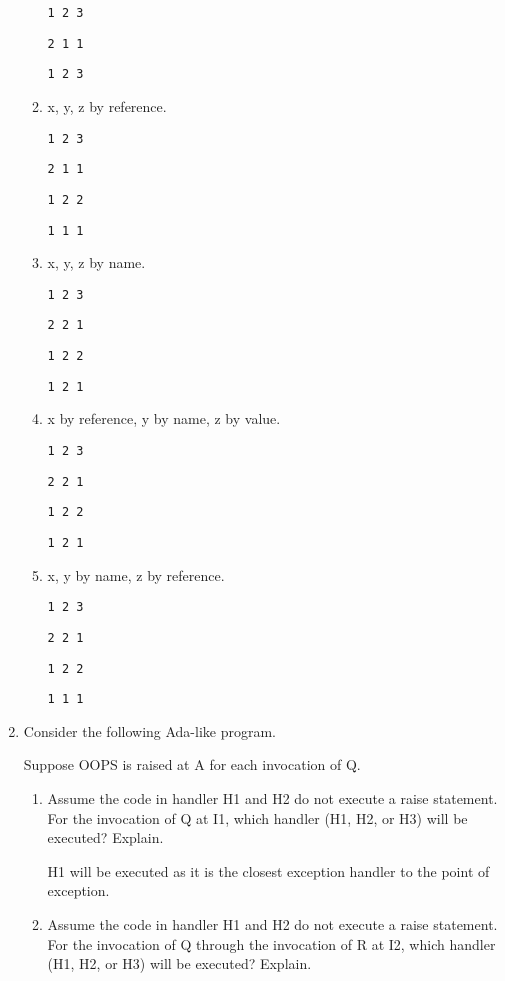 \documentclass[12pt,letterpaper]{article}
\begin{document}
\begin{enumerate}
\begin{enumerate}
          \texttt{1 2 3}

          \texttt{2 1 1}

          \texttt{1 2 3}

        \item x, y, z by reference.

          \texttt{1 2 3}

          \texttt{2 1 1}

          \texttt{1 2 2}

          \texttt{1 1 1}

        \item x, y, z by name.

          \texttt{1 2 3}

          \texttt{2 2 1}

          \texttt{1 2 2}

          \texttt{1 2 1}

        \item x by reference, y by name, z by value.

          \texttt{1 2 3}

          \texttt{2 2 1}

          \texttt{1 2 2}

          \texttt{1 2 1}

        \item x, y by name, z by reference.

          \texttt{1 2 3}

          \texttt{2 2 1}

          \texttt{1 2 2}

          \texttt{1 1 1}
      \end{enumerate}

      \item
        Consider the following Ada-like program.

        Suppose OOPS is raised at A for each invocation of Q.

        \begin{enumerate}
          \item
            Assume the code in handler H1 and H2 do not execute a raise statement.
            For the invocation of Q at I1, which handler (H1, H2, or H3) will be executed? Explain.

            H1 will be executed as it is the closest exception handler to the point of exception.

          \item
            Assume the code in handler H1 and H2 do not execute a raise statement.
            For the invocation of Q through the invocation of R at I2,
            which handler (H1, H2, or H3) will be executed? Explain.


\end{enumerate}
\end{enumerate}
\end{document}
